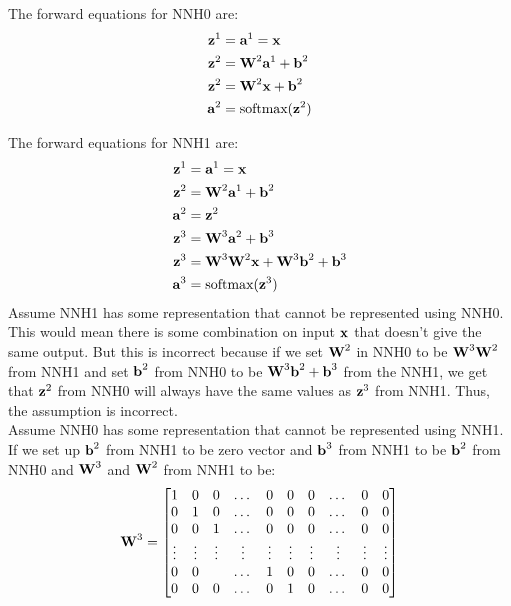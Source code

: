 \documentclass[10pt,a4paper]{article}
\begin{document}
\begin{enumerate}
\begin{enumerate}
The forward equations for NNH0 are:
\begin{align}
\textbf{\text{{z}}}^1 &= \textbf{\text{{a}}}^1 = \textbf{\text{{x}}} \label{eq:a1}\\
\textbf{\text{{z}}}^2&=\textbf{\text{{W}}}^2\textbf{\text{{a}}}^1+\textbf{\text{{b}}}^2 \label{eq:z2}\\
\textbf{\text{{z}}}^2 &= \textbf{\text{{W}}}^2\textbf{\text{{x}}}+\textbf{\text{{b}}}^2 \label{eq:fullz2}\\
\textbf{\text{{a}}}^2 &=\text{softmax}(\textbf{\text{{z}}}^2) \label{eq:a2}
\end{align}

The forward equations for NNH1 are:
\begin{align}
\textbf{\text{{z}}}^1 &= \textbf{\text{{a}}}^1 = \textbf{\text{{x}}} \label{eq:a1h}\\
\textbf{\text{{z}}}^2&=\textbf{\text{{W}}}^2\textbf{\text{{a}}}^1+\textbf{\text{{b}}}^2 \label{eq:z2h}\\
\textbf{\text{{a}}}^2 &= \textbf{\text{{z}}}^2 \label{eq:a2h}\\
\textbf{\text{{z}}}^3&=\textbf{\text{{W}}}^3\textbf{\text{{a}}}^2+\textbf{\text{{b}}}^3 \label{eq:z3h}\\
\textbf{\text{{z}}}^3 &= \textbf{\text{{W}}}^3\textbf{\text{{W}}}^2\textbf{\text{{x}}}+\textbf{\text{{W}}}^3\textbf{\text{{b}}}^2 + \textbf{\text{{b}}}^3 \label{eq:fullz3h}\\
\textbf{\text{{a}}}^3 &=\text{softmax}(\textbf{\text{{z}}}^3) \label{eq:a3h}
\end{align}
Assume NNH1 has some representation that cannot be represented using NNH0. This would mean there is some combination on input $\vect{x}$ that doesn't give the same output. But this is incorrect because if we set $\mat{W}^2$ in NNH0 to be $\mat{W}^3\mat{W}^2$ from NNH1 and set $\mat{b}^2$ from NNH0 to be $\mat{W}^3\vect{b}^2 + \vect{b}^3$ from the NNH1, we get that $\vect{z}^2$ from NNH0 will always have the same values as $\vect{z}^3$ from NNH1. Thus, the assumption is incorrect. \\
Assume NNH0 has some representation that cannot be represented using NNH1. If we set up $\vect{b}^2$ from NNH1 to be zero vector and $\vect{b}^3$ from NNH1 to be $\vect{b}^2$ from NNH0 and $\mat{W}^3$ and $\mat{W}^2$ from NNH1 to be:
$$\mat{W}^3= 
\begin{bmatrix}
    1 & 0 & 0 & \dots & 0 & 0 &0& \dots & 0 & 0\\
    0 & 1 & 0 & \dots & 0 & 0 &0& \dots & 0 & 0\\
    0 & 0 & 1 & \dots & 0 & 0 &0& \dots & 0 & 0\\
   \vdots & \vdots  & \vdots  & \vdots  & \vdots  & \vdots & \vdots& \vdots & \vdots& \vdots  \\
    0 & 0 &  & \dots & 1& 0  &0& \dots & 0 & 0\\
	0 & 0 & 0 & \dots & 0 & 1 &0  & \dots & 0 & 0\\             

\end{bmatrix}$$
\end{enumerate}
\end{enumerate}
\end{document}
